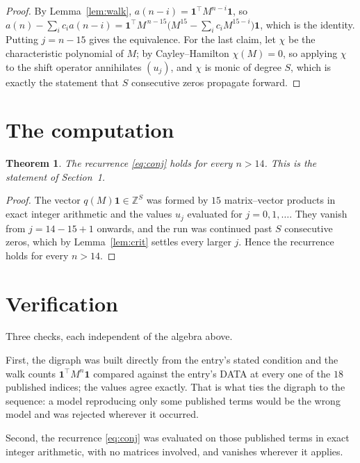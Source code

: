 \documentclass[11pt,a4paper]{article}
\theoremstyle{plain}
\newtheorem{theorem}{Theorem}
\theoremstyle{definition}
\begin{document}
\begin{proof}
By Lemma~\ref{lem:walk}, $a(n-i)=\mathbf{1}^{\!\top}M^{n-i}\mathbf{1}$, so
$a(n)-\sum_i c_i a(n-i)
=\mathbf{1}^{\!\top}M^{\,n-15}\bigl(M^{15}-\sum_i c_i M^{15-i}\bigr)
\mathbf{1}$, which is the identity. Putting $j=n-15$ gives the equivalence. For the
last claim, let $\chi$ be the characteristic polynomial of $M$; by Cayley--Hamilton
$\chi(M)=0$, so applying $\chi$ to the shift operator annihilates $(u_j)$, and $\chi$ is
monic of degree $S$, which is exactly the statement that $S$ consecutive zeros propagate
forward.
\end{proof}

\section{The computation}

\begin{theorem}
The recurrence \eqref{eq:conj} holds for every $n>14$. This is the statement of
Section~1.
\end{theorem}

\begin{proof}
The vector $q(M)\mathbf{1}\in\mathbb{Z}^{S}$ was formed by $15$ matrix--vector
products in exact integer arithmetic and the values $u_j$ evaluated for
$j=0,1,\dots$. They vanish from $j=14-15+1$ onwards, and the run was continued past
$S$ consecutive zeros, which by Lemma~\ref{lem:crit} settles every larger $j$. Hence the
recurrence holds for every $n>14$.
\end{proof}

\section{Verification}

Three checks, each independent of the algebra above.

First, the digraph was built directly from the entry's stated condition and the walk counts
$\mathbf{1}^{\!\top}M^{n}\mathbf{1}$ compared against the entry's DATA at every one of
the $18$ published indices; the values agree exactly. That is what ties the digraph to
the sequence: a model reproducing only some published terms would be the wrong model and
was rejected wherever it occurred.

Second, the recurrence \eqref{eq:conj} was evaluated on those published terms in exact
integer arithmetic, with no matrices involved, and vanishes wherever it applies.
\end{document}
